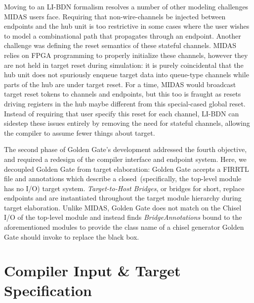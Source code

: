 Moving to an LI-BDN formalism resolves a number of other modeling
challenges MIDAS users face.  Requiring that non-wire-channels be injected
between endpoints and the hub unit is too restrictive in some cases where
the user wishes to model a combinational path that propagates through an
endpoint. Another challenge was defining the reset semantics of these
stateful channels.  MIDAS relies on FPGA programming to properly initialize
these channels, however they are not held in target reset during
simulation: it is purely coincidental that the hub unit does not
spuriously enqueue target data into queue-type channels while parts of the
hub are under target reset. For a time, MIDAS would broadcast target reset
tokens to channels and endpoints, but this too is fraught as resets driving
registers in the hub maybe different from this special-cased global reset.
Instead of requiring that user specify this reset for each channel, LI-BDN
can sidestep these issues entirely by removing the need for stateful
channels, allowing the compiler to assume fewer things about target.

The second phase of Golden Gate's development addressed the fourth objective,
and required a redesign of the compiler interface and endpoint system. Here, we
decoupled Golden Gate from target elaboration: Golden Gate accepts a FIRRTL
file and annotations which describe a closed~(specifically, the top-level
module has no I/O) target system. \emph{Target-to-Host Bridges}, or bridges for
short, replace endpoints and are instantiated throughout the target module
hierarchy during target elaboration. Unlike MIDAS, Golden Gate does not match
on the Chisel I/O of the top-level module and instead finds
\emph{BridgeAnnotations} bound to the aforementioned modules to provide the
class name of a chisel generator Golden Gate should invoke to replace the black
box.

\section{Compiler Input \& Target Specification}

